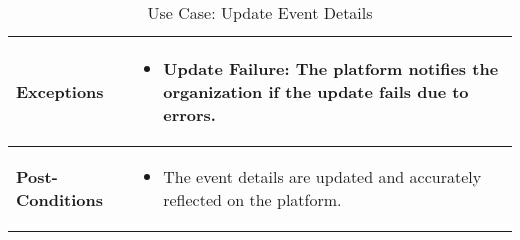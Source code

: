 \begin{table}[!ht]
\begin{tabularx}{\textwidth}{|l|X|}
        \hline
        \textbf{Exceptions} & 
        \begin{itemize}[label=--,itemsep=0pt]
            \item Update Failure: The platform notifies the organization if the update fails due to errors.
        \end{itemize} \\
        \hline
        \textbf{Post-Conditions} & 
        \begin{itemize}[label=--,itemsep=0pt]
            \item The event details are updated and accurately reflected on the platform.
        \end{itemize} \\
        \hline
    \end{tabularx}
    \caption{Use Case: Update Event Details}
    \label{tab:use-case-update-event-details-option}
\end{table}



